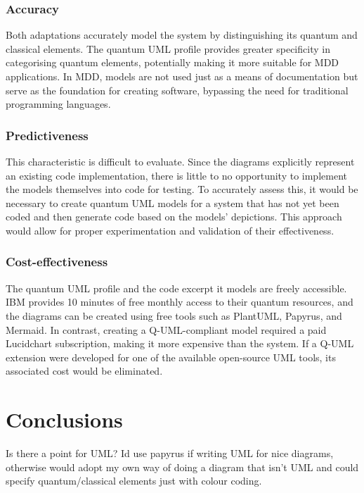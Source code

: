 \documentclass{article}
\begin{document}
\subsubsection{Accuracy}

Both adaptations accurately model the system by distinguishing its quantum and classical elements. The quantum UML profile provides greater specificity in categorising quantum elements, potentially making it more suitable for MDD applications. In MDD, models are not used just as a means of documentation but serve as the foundation for creating software, bypassing the need for traditional programming languages\cite{LUCIO2014103}. 

\subsubsection{Predictiveness}

This characteristic is difficult to evaluate. Since the diagrams explicitly represent an existing code implementation, there is little to no opportunity to implement the models themselves into code for testing. To accurately assess this, it would be necessary to create quantum UML models for a system that has not yet been coded and then generate code based on the models' depictions. This approach would allow for proper experimentation and validation of their effectiveness.

\subsubsection{Cost-effectiveness}

The quantum UML profile and the code excerpt it models are freely accessible. IBM provides 10 minutes of free monthly access to their quantum resources, and the diagrams can be created using free tools such as PlantUML, Papyrus, and Mermaid. In contrast, creating a Q-UML-compliant model required a paid Lucidchart subscription, making it more expensive than the system. If a Q-UML extension were developed for one of the available open-source UML tools, its associated cost would be eliminated.

\section{Conclusions}

Is there a point for UML?
Id use papyrus if writing UML for nice diagrams, otherwise would adopt my own way of doing a diagram that isn't UML and could specify quantum/classical elements just with colour coding.
\end{document}
